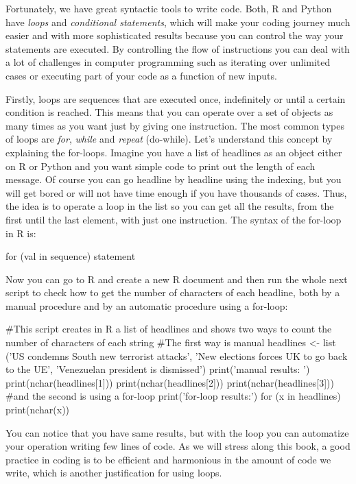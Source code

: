 Fortunately, we have great syntactic tools to write code. Both, R and Python have \emph{loops} and \emph{conditional statements}, which will make your coding journey much easier and with more sophisticated results because you can control the way your statements are executed. By controlling the flow of instructions you can deal with a lot of challenges in computer programming such as iterating over unlimited cases or executing part of your code as a function of new inputs. 

Firstly, loops are sequences that are executed once, indefinitely or until a certain condition is reached. This means that you can operate over a set of objects as many times as you want just by giving one instruction. The most common types of loops are \emph{for}, \emph{while} and \emph{repeat} (do-while). Let’s understand this concept by explaining the for-loops. Imagine you have a list of headlines as an object either on R or Python and you want simple code to print out the length of each message. Of course you can go headline by headline using the indexing, but you will get bored or will not have time enough if you have thousands of cases. Thus, the idea is to operate a loop in the list so you can get all the results, from the first until the last element, with just one instruction.  The syntax of the for-loop in R is:

\begin{exampler}
for (val in sequence)
{
statement
}
\end{exampler}

Now you can go to R and create a new R document and then run the whole next script to check how to get the number of characters of each headline, both by a manual procedure and by an automatic procedure using a for-loop:

\begin{exampler}
#This script creates in R a list of headlines and shows two ways to count the number of characters of each string
#The first way is manual 
headlines <- list ('US condemns South new terrorist  attacks', 'New elections forces UK to go back to the UE', 'Venezuelan president is dismissed') 
print('manual results:	')
print(nchar(headlines[1]))
print(nchar(headlines[2]))
print(nchar(headlines[3]))
#and the second is using a for-loop
print('for-loop results:')
for (x in headlines){
  print(nchar(x))
}
\end{exampler}

You can notice that you have same results, but with the loop you can automatize your operation writing few lines of code. As we will stress along this book, a good practice in coding is to be efficient and harmonious in the amount of code we write, which is another justification for using loops.  

